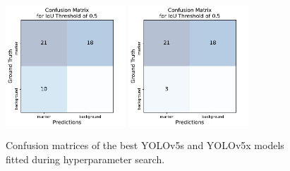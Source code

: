 \documentclass[10pt]{book}
\begin{document}
\begin{figure} %
  \centering
     {\includegraphics[width=0.4\textwidth]{image/yolov5s_hyp_search_confusion_matrix}}
     {\includegraphics[width=0.4\textwidth]{image/yolov5x_hyp_search_confusion_matrix}}
  \caption{Confusion matrices of the best \ac{YOLO}v5s and \ac{YOLO}v5x models fitted during hyperparameter search.}
  \label{fig:confusion_matrix_compare}
\end{figure}
\end{document}

